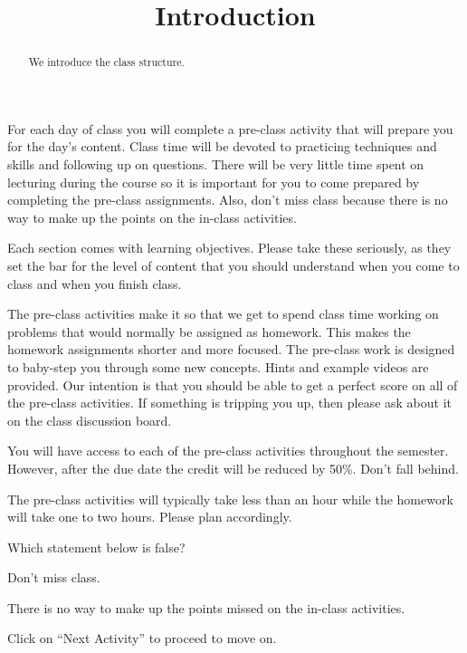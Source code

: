 \documentclass{ximera}
\title{Introduction}
\begin{document}
\begin{abstract}
We introduce the class structure.
\end{abstract}
\maketitle

For each day of class you will complete a pre-class activity that will prepare you for the day's content. Class time will be devoted to practicing techniques and skills and following up on questions. There will be very little time spent on lecturing during the course so it is important for you to come prepared by completing the pre-class assignments. Also, don't miss class because there is no way to make up the points on the in-class activities.

Each section comes with learning objectives. Please take these seriously, as they set the bar for the level of content that you should understand when you come to class and when you finish class. 

The pre-class activities make it so that we get to spend class time working on problems that would normally be assigned as homework. This makes the homework assignments shorter and more focused. The pre-class work is designed to baby-step you through some new concepts. Hints and example videos are provided. Our intention is that you should be able to get a perfect score on all of the pre-class activities. If something is tripping you up, then please ask about it on the class discussion board.

You will have access to each of the pre-class activities throughout the semester. However, after the due date the credit will be reduced by 50\%. Don't fall behind.

The pre-class activities will typically take less than an hour while the homework will take one to two hours. Please plan accordingly.


\begin{question}
Which statement below is false?
    \begin{multiple-choice}
    \end{multiple-choice}
    \begin{hint}
    Don't miss class. 
    \end{hint}
    \begin{hint}
    There is no way to make up the points missed on the in-class activities. 
    \end{hint}
\end{question}

Click on ``Next Activity'' to proceed to move on.
\end{document}
